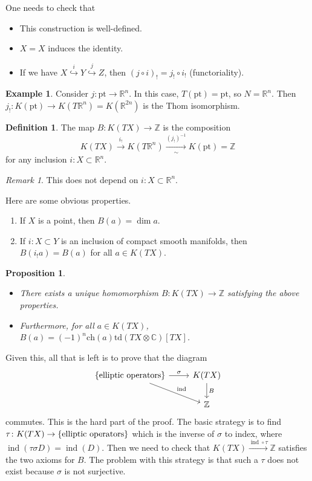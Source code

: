 \documentclass[leqno, openany]{memoir}
\newtheorem{prop}[thm]{Proposition}
\theoremstyle{definition}
\newtheorem{defn}[thm]{Definition}
\newtheorem{exm}[thm]{Example}
\theoremstyle{remark}
\newtheorem{rmk}[thm]{Remark}
\theoremstyle{plain}
\theoremstyle{definition}
\theoremstyle{remark}
\newcommand{\R}{\mathbb{R}}
\newcommand{\C}{\mathbb{C}}
\newcommand{\Z}{\mathbb{Z}}
\newcommand{\mr}[1]{\mathrm{#1}}
\DeclareMathOperator{\ind}{ind}
\begin{document}
One needs to check that
\begin{itemize}
    \item This construction is well-defined.
    \item $X = X$ induces the identity.
    \item If we have $X \overset{i}{\hookrightarrow} Y \overset{j}{\hookrightarrow} Z$, then ${(j \circ i)}_! = j_! \circ i_{ ! }$ (functoriality).
\end{itemize}

\begin{exm}
    Consider $j \colon \mr{pt} \to \R^n$. In this case, $T(\mr{pt}) = \mr{pt}$, so $N = \R^n$. Then $j_! \colon K(\mr{pt}) \to K(T\R^n) = K(\R^{2n})$ is the Thom isomorphism.
\end{exm}

\begin{defn}
    The map $B \colon K(TX) \to \Z$ is the composition 
    \[ K(TX) \xrightarrow{i_!} K(T\R^n) \xrightarrow[\sim]{{(j_!)}^{-1}} K(\mr{pt}) = \Z \]
    for any inclusion $i \colon X \subset \R^n$.
\end{defn}

\begin{rmk}
    This does not depend on $i \colon X \subset \R^n$.
\end{rmk}

Here are some obvious properties. 
\begin{enumerate}
    \item If $X$ is a point, then $B(a) = \dim a$.
    \item If $i \colon X \subset Y$ is an inclusion of compact smooth manifolds, then $B(i_! a) = B(a)$ for all $a \in K(TX)$.
\end{enumerate}

\begin{prop}\leavevmode
    \begin{itemize}
        \item There exists a unique homomorphism $B \colon K(TX) \to \Z$ satisfying the above properties.
        \item Furthermore, for all $a \in K(TX)$, $B(a) = {(-1)}^n \mr{ch}(a) \mr{td}(TX \otimes \C) [TX]$.
    \end{itemize}
\end{prop}

Given this, all that is left is to prove that the diagram
\begin{equation*}
\begin{tikzcd}
    \qty{\text{elliptic operators}} \ar{r}{\sigma} \ar{dr}{\ind} & K(TX) \ar{d}{B} \\
                                                                 & \Z
\end{tikzcd}
\end{equation*}
commutes. This is the hard part of the proof. The basic strategy is to find $\tau \colon K(TX) \to \qty{\text{elliptic operators}}$ which is the inverse of $\sigma$ to index, where $\ind(\tau \sigma D) = \ind(D)$. Then we need to check that $K(TX) \xrightarrow{\ind \circ \tau} \Z$ satisfies the two axioms for $B$. The problem with this strategy is that such a $\tau$ does not exist because $\sigma$ is not surjective.
\end{document}
